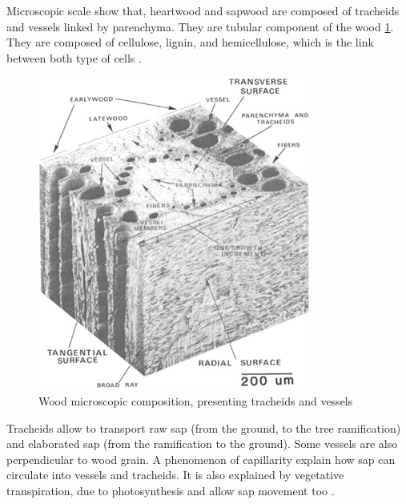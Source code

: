 Microscopic scale show that, heartwood and sapwood are composed of tracheids and vessels linked by parenchyma. They are tubular component of the wood \ref{fig:Fig1}. They are composed of cellulose, lignin, and hemicellulose, which is the link between both type of cells \parencite{Reference1}.
\begin{figure}[th]
	\centering
	\includegraphics{Figures/Tracheids}
	\decoRule
	\caption[Wood microscopic composition]{Wood microscopic composition, presenting tracheids and vessels}
	\label{fig:Fig1}
\end{figure}
Tracheids allow to transport raw sap (from the ground, to the tree ramification) and elaborated sap (from the ramification to the ground). Some vessels are also perpendicular to wood grain. A phenomenon of capillarity explain how sap can circulate into vessels and tracheids. It is also explained by vegetative transpiration, due to photosynthesis and allow sap movement too \parencite{Reference1}.

